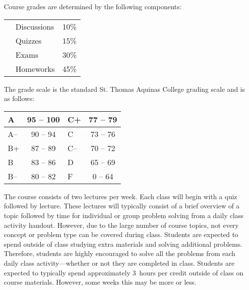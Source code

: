 \documentclass[11pt,letterpaper]{article}
\begin{document}
Course grades are determined by the following components: \par
	\begin{table}[!ht]
        \begin{tabular}{clr}
        & Discussions & 10\% \\
	& Quizzes & 15\% \\
	& Exams & 30\% \\
	& Homeworks & 45\% \\
        \end{tabular} 
        \end{table}
\pspace



The grade scale is the standard St. Thomas Aquinas College grading scale and is as follows: \par
        \begin{table}[!ht]
        \centering
        \begin{tabular}{|l||c|l||c|} \hline
        A & 95 -- 100 & C+ & 77 -- 79 \\ \hline
        A-- & 90 -- 94 & C & 73 -- 76 \\ \hline
        B+ & 87 -- 89 & C-- & 70 -- 72 \\ \hline
        B & 83 -- 86 & D & 65 -- 69 \\ \hline
        B-- & 80 -- 82 & F & 0 -- 64 \\ \hline
        \end{tabular}
        \end{table} \pspace



The course consists of two lectures per week. Each class will begin with a quiz followed by lecture. These lectures will typically consist of a brief overview of a topic followed by time for individual or group problem solving from a daily class activity handout. However, due to the large number of course topics, not every concept or problem type can be covered during class. Students are expected to spend outside of class studying extra materials and solving additional problems. Therefore, students are highly encouraged to solve all the problems from each daily class activity---whether or not they are completed in class. Students are expected to typically spend approximately 3~hours per credit outside of class on course materials. However, some weeks this may be more or less. \sectionbreak
\end{document}
